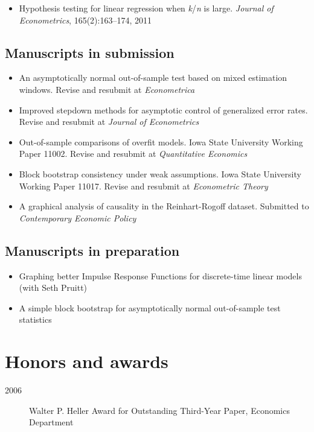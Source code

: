 \documentclass[12pt]{article}%
\newcommand{\allcaps}[1]{\textls{\MakeUppercase{#1}}}
\begin{document}
\begin{itemize}
\item Hypothesis testing for linear regression when
\textit{k}/\textit{n} is large. \textit{Journal of Econometrics},
165(2):163--174, 2011
\end{itemize}

\subsection*{Manuscripts in submission}

\begin{itemize}
\item An asymptotically normal out-of-sample test based on mixed
  estimation windows. Revise and resubmit at \textit{Econometrica}
\item Improved stepdown methods for asymptotic control of generalized
  error rates. Revise and resubmit at \textit{Journal of Econometrics}
\item Out-of-sample comparisons of overfit models. Iowa State
  University Working Paper 11002. Revise and resubmit at
  \textit{Quantitative Economics}
\item Block bootstrap consistency under weak assumptions. Iowa State
  University Working Paper 11017. Revise and resubmit at
  \textit{Econometric Theory}
\item A graphical analysis of causality in the Reinhart-Rogoff
  dataset. Submitted to \textit{Contemporary Economic Policy}
\end{itemize}

\subsection*{Manuscripts in preparation}
\begin{itemize}
\item Graphing better Impulse Response Functions for discrete-time
  linear models (with Seth Pruitt)
\item A simple block bootstrap for asymptotically normal out-of-sample
  test statistics
\end{itemize}

\section*{Honors and awards}

\begin{description}
\item[2006] Walter P. Heller Award for Outstanding Third-Year Paper,
\allcaps{UCSD} Economics Department
\end{description}
\end{document}
